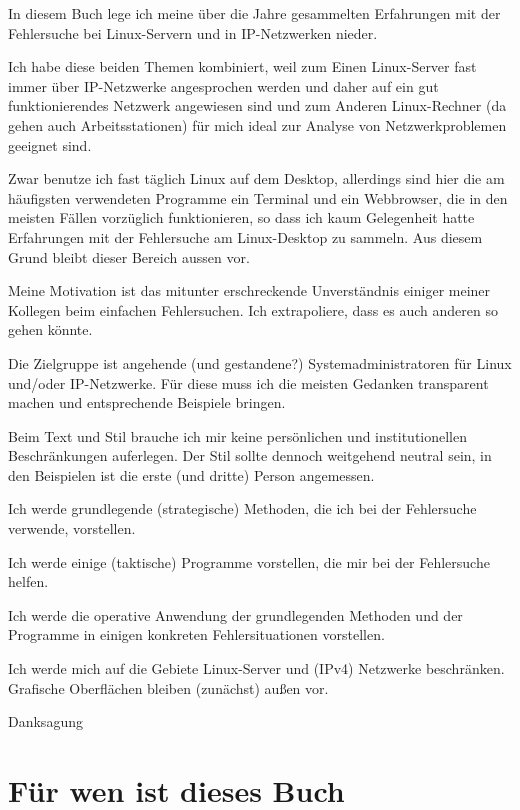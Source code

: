 \begin{normaltext}
  In diesem Buch lege ich meine über die Jahre gesammelten Erfahrungen mit
  der Fehlersuche bei Linux-Servern und in IP-Netzwerken nieder.

  Ich habe diese beiden Themen kombiniert, weil zum Einen Linux-Server fast
  immer über IP-Netzwerke angesprochen werden und daher auf ein gut
  funktionierendes Netzwerk angewiesen sind und zum Anderen Linux-Rechner
  (da gehen auch Arbeitsstationen) für mich ideal zur Analyse von
  Netzwerkproblemen geeignet sind.

  Zwar benutze ich fast täglich Linux auf dem Desktop, allerdings sind hier
  die am häufigsten verwendeten Programme ein Terminal und ein Webbrowser, die
  in den meisten Fällen vorzüglich funktionieren, so dass ich kaum Gelegenheit
  hatte Erfahrungen mit der Fehlersuche am Linux-Desktop zu sammeln. Aus
  diesem Grund bleibt dieser Bereich aussen vor.
\end{normaltext}
\begin{notes}
\item Meine Motivation ist das mitunter erschreckende Unverständnis einiger
  meiner Kollegen beim einfachen Fehlersuchen. Ich extrapoliere, dass es auch
  anderen so gehen könnte.
\item Die Zielgruppe ist angehende (und gestandene?) Systemadministratoren für
  Linux und/oder IP-Netzwerke. Für diese muss ich die meisten Gedanken
  transparent machen und entsprechende Beispiele bringen.
\item Beim Text und Stil brauche ich mir keine persönlichen und
  institutionellen Beschränkungen auferlegen. Der Stil sollte dennoch
  weitgehend neutral sein, in den Beispielen ist die erste (und dritte)
  Person angemessen.
\item Ich werde grundlegende (strategische) Methoden, die ich bei der
  Fehlersuche verwende, vorstellen.
\item Ich werde einige (taktische) Programme vorstellen, die mir bei der
  Fehlersuche helfen.
\item Ich werde die operative Anwendung der grundlegenden Methoden und der
  Programme in einigen konkreten Fehlersituationen vorstellen.
\item Ich werde mich auf die Gebiete Linux-Server und (IPv4) Netzwerke
  beschränken. Grafische Oberflächen bleiben (zunächst) außen vor.
\item Danksagung
\end{notes}

\section*{Für wen ist dieses Buch}
\label{sec:fuerwen}

